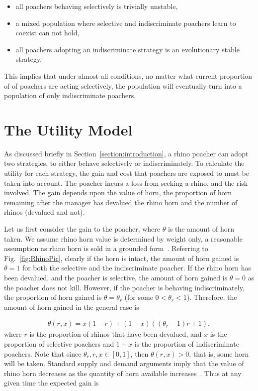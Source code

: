 \documentclass[10pt]{article}
\begin{document}
\begin{itemize}
    \item all poachers behaving selectively is trivially unstable,
    \item a mixed population where selective and indiscriminate poachers
          learn to coexist can not hold,
    \item all poachers adopting an indiscriminate strategy is an evolutionary
          stable strategy.
\end{itemize}

This implies that under almost all conditions, no matter what current proportion
of
of poachers are acting selectively, the population will eventually turn into a
population of only indiscriminate poachers.

\section{The Utility Model}\label{section:the_model}

As discussed briefly in Section~\ref{section:introduction}, a rhino poacher
can adopt two strategies, to either behave selectively
or indiscriminately. To calculate the utility for each strategy, the gain and cost
that poachers are exposed to must be taken into account. The poacher incurs a
loss from seeking a rhino, and the risk involved. The gain depends upon the value
of horn, the proportion of horn remaining after the manager has devalued the 
rhino horn and the number of rhinos (devalued and not).

Let us first consider the gain to the poacher, where \(\theta\) is the amount of
horn taken. We assume rhino horn value is determined by weight only, a 
reasonable assumption as rhino horn is sold in a grounded form~\citep{Saverhino}.
Referring to Fig.~\ref{fig:RhinoPic}, clearly if the horn is intact, the amount of
horn gained is \(\theta=1\) for both the selective and the indiscriminate poacher.
If the rhino horn has been devalued, and the poacher is selective, the amount of
horn gained is \(\theta=0\) as the poacher does not kill. However, if the poacher
is behaving indiscriminately, the proportion of horn gained is \(\theta = \theta_r\)
(for some \(0<\theta_r<1\)). Therefore, the amount of horn gained in the 
general case is

\begin{eqnarray}
    \label{eqn:theta}
    \theta(r, x) = x (1 - r) + (1 - x) ((\theta_r - 1) r + 1),
\end{eqnarray}
where \(r\) is the proportion of rhinos that have been devalued, and \(x\) is the
proportion of selective poachers and \(1-x\) is the proportion of indiscriminate
poachers. Note that since \(\theta_r, r, x  \in [0, 1]\), then
\(\theta(r, x) > 0\), that is, some horn will be taken. Standard supply and demand
arguments imply that the value
of rhino horn decreases as the quantity of horn available increases~\citep{mankiw2010}.
Thus at any given time the expected gain is
\end{document}
